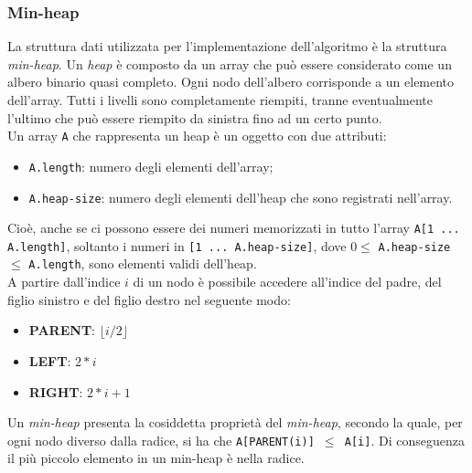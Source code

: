 	\subsubsection{Min-heap}
		La struttura dati utilizzata per l'implementazione dell'algoritmo è la struttura \textit{min-heap}. 
		Un \textit{heap} è composto da un array che può essere considerato come un albero binario quasi completo. 
		Ogni nodo dell'albero corrisponde a un elemento dell'array. 
		Tutti i livelli sono completamente riempiti, tranne eventualmente l'ultimo che può essere riempito da sinistra fino ad un certo punto.\\
		Un array \texttt{A} che rappresenta un heap è un oggetto con due attributi:
		\begin{itemize}
			\item \texttt{A.length}: numero degli elementi dell'array;
			\item \texttt{A.heap-size}: numero degli elementi dell'heap che sono registrati nell'array.
		\end{itemize}
		Cioè, anche se ci possono essere dei numeri memorizzati in tutto l'array \texttt{A[1 ... A.length]}, soltanto i numeri in \texttt{[1 ... A.heap-size]}, dove $0 \leq$ \texttt{A.heap-size} $\leq$ \texttt{A.length}, sono elementi validi dell'heap.\\
		A partire dall'indice $i$ di un nodo è possibile accedere all'indice del padre, del figlio sinistro e del figlio destro nel seguente modo:
		\begin{itemize}
			\item \textbf{PARENT}: $\lfloor i/2 \rfloor$ 
			\item \textbf{LEFT}: $2 \ast i$
			\item \textbf{RIGHT}: $2 \ast i + 1$
		\end{itemize}
		Un \textit{min-heap} presenta la cosiddetta proprietà del \textit{min-heap}, secondo la quale, per ogni nodo diverso dalla radice, si ha che \texttt{A[PARENT(i)] $\leq$ A[i]}. Di conseguenza il più piccolo elemento in un min-heap è nella radice.
		
